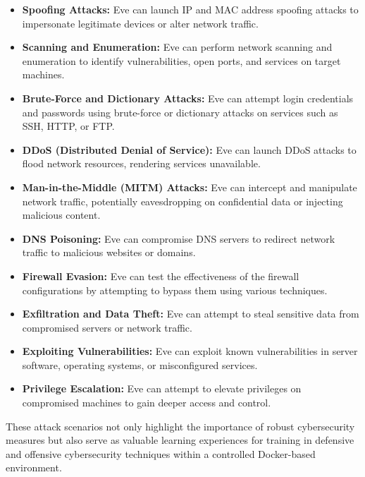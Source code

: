 \documentclass[a4paper,10pt]{article}
\begin{document}
\begin{itemize}
    \item \textbf{Spoofing Attacks:} Eve can launch IP and MAC address spoofing attacks to impersonate legitimate devices or alter network traffic.

    \item \textbf{Scanning and Enumeration:} Eve can perform network scanning and enumeration to identify vulnerabilities, open ports, and services on target machines.

    \item \textbf{Brute-Force and Dictionary Attacks:} Eve can attempt login credentials and passwords using brute-force or dictionary attacks on services such as SSH, HTTP, or FTP.

    \item \textbf{DDoS (Distributed Denial of Service):} Eve can launch DDoS attacks to flood network resources, rendering services unavailable.

    \item \textbf{Man-in-the-Middle (MITM) Attacks:} Eve can intercept and manipulate network traffic, potentially eavesdropping on confidential data or injecting malicious content.

    \item \textbf{DNS Poisoning:} Eve can compromise DNS servers to redirect network traffic to malicious websites or domains.

    \item \textbf{Firewall Evasion:} Eve can test the effectiveness of the firewall configurations by attempting to bypass them using various techniques.

    \item \textbf{Exfiltration and Data Theft:} Eve can attempt to steal sensitive data from compromised servers or network traffic.

    \item \textbf{Exploiting Vulnerabilities:} Eve can exploit known vulnerabilities in server software, operating systems, or misconfigured services.

    \item \textbf{Privilege Escalation:} Eve can attempt to elevate privileges on compromised machines to gain deeper access and control.

\end{itemize}

These attack scenarios not only highlight the importance of robust cybersecurity measures but also serve as valuable learning experiences for training in defensive and offensive cybersecurity techniques within a controlled Docker-based environment.
\end{document}
